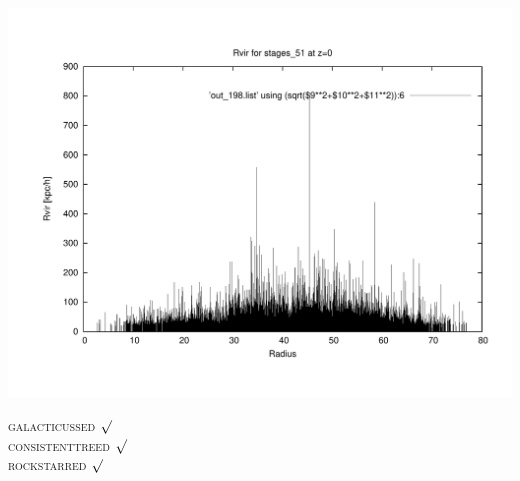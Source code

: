 \includegraphics[scale=0.3]{stages_51/plot_rvir_z0.pdf}

\textsc{galacticussed} $\surd$ \\
\textsc{consistenttreed} $\surd$ \\ 
\textsc{rockstarred} $\surd$







